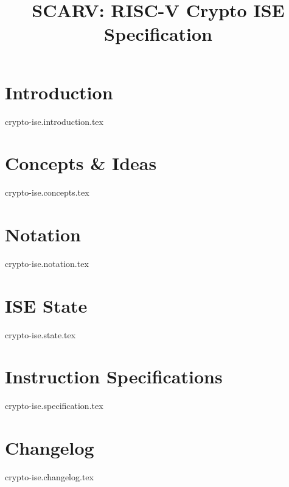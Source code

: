 \documentclass{article}
\title{SCARV: RISC-V Crypto ISE \\ Specification}
\begin{document}
\maketitle

\tableofcontents

\section{Introduction}
{crypto-ise.introduction.tex}

\section{Concepts \& Ideas}
{crypto-ise.concepts.tex}

\section{Notation}
{crypto-ise.notation.tex}

\section{ISE State}
{crypto-ise.state.tex}

\section{Instruction Specifications}
{crypto-ise.specification.tex}


\printbibliography

\newpage
\section{Changelog}
{crypto-ise.changelog.tex}
\end{document}
